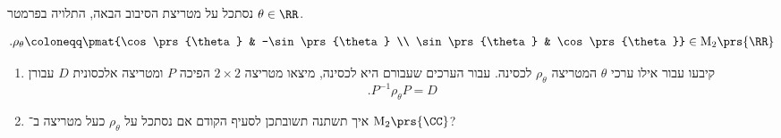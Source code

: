 \documentclass[a4paper,10pt,twoside,openany]{book}
\renewcommand{\Mat}{\mathrm{M}}
\begin{document}
\begin{exercisechap}
נסתכל על מטריצת הסיבוב הבאה, התלויה בפרמטר
$\theta \in \RR$.

\begin{align*}
\text{.} \rho_\theta \coloneqq \pmat{\cos\prs{\theta} & -\sin\prs{\theta} \\ \sin\prs{\theta} & \cos\prs{\theta}} \in \Mat_2\prs{\RR}
\end{align*}

\begin{enumerate}
\item קיבעו עבור אילו ערכי
$\theta$
המטריצה
$\rho_\theta$
לכסינה. עבור הערכים שעבורם היא לכסינה, מיצאו מטריצה
$2 \times 2$
הפיכה
$P$
ומטריצה אלכסונית
$D$
עבורן
\[\text{.} P^{-1} \rho_\theta P = D\]

\item איך תשתנה תשובתכן לסעיף הקודם אם נסתכל על
$\rho_\theta$
כעל מטריצה ב־%
$\Mat_2\prs{\CC}$?
\end{enumerate}
\end{exercisechap}
\end{document}
